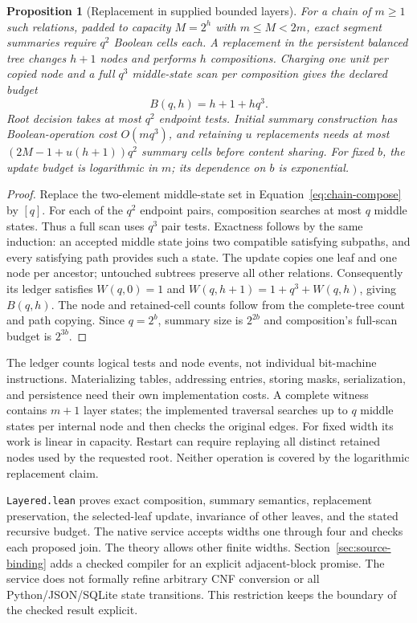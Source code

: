 \documentclass[11pt,a4paper]{article}
\numberwithin{equation}{section}
\theoremstyle{plain}
\newtheorem{proposition}[lemma]{Proposition}
\theoremstyle{definition}
\theoremstyle{remark}
\begin{document}
\begin{proposition}[Replacement in supplied bounded layers]
\label{prop:layered}
For a chain of $m\geq1$ such relations, padded to capacity $M=2^h$ with $m\leq M<2m$, exact segment summaries require $q^2$ Boolean cells each. A replacement in the persistent balanced tree changes $h+1$ nodes and performs $h$ compositions. Charging one unit per copied node and a full $q^3$ middle-state scan per composition gives the declared budget
\[
B(q,h)=h+1+hq^3.
\]
Root decision takes at most $q^2$ endpoint tests. Initial summary construction has Boolean-operation cost $O(mq^3)$, and retaining $u$ replacements needs at most $(2M-1+u(h+1))q^2$ summary cells before content sharing. For fixed $b$, the update budget is logarithmic in $m$; its dependence on $b$ is exponential.
\end{proposition}

\begin{proof}
Replace the two-element middle-state set in Equation~\eqref{eq:chain-compose} by $[q]$. For each of the $q^2$ endpoint pairs, composition searches at most $q$ middle states. Thus a full scan uses $q^3$ pair tests. Exactness follows by the same induction: an accepted middle state joins two compatible satisfying subpaths, and every satisfying path provides such a state. The update copies one leaf and one node per ancestor; untouched subtrees preserve all other relations. Consequently its ledger satisfies $W(q,0)=1$ and $W(q,h+1)=1+q^3+W(q,h)$, giving $B(q,h)$. The node and retained-cell counts follow from the complete-tree count and path copying. Since $q=2^b$, summary size is $2^{2b}$ and composition's full-scan budget is $2^{3b}$.
\end{proof}

The ledger counts logical tests and node events, not individual bit-machine instructions. Materializing tables, addressing entries, storing masks, serialization, and persistence need their own implementation costs. A complete witness contains $m+1$ layer states; the implemented traversal searches up to $q$ middle states per internal node and then checks the original edges. For fixed width its work is linear in capacity. Restart can require replaying all distinct retained nodes used by the requested root. Neither operation is covered by the logarithmic replacement claim.

\texttt{Layered.lean} proves exact composition, summary semantics, replacement preservation, the selected-leaf update, invariance of other leaves, and the stated recursive budget. The native service accepts widths one through four and checks each proposed join. The theory allows other finite widths. Section~\ref{sec:source-binding} adds a checked compiler for an explicit adjacent-block promise. The service does not formally refine arbitrary CNF conversion or all Python/JSON/SQLite state transitions. This restriction keeps the boundary of the checked result explicit.
\end{document}

